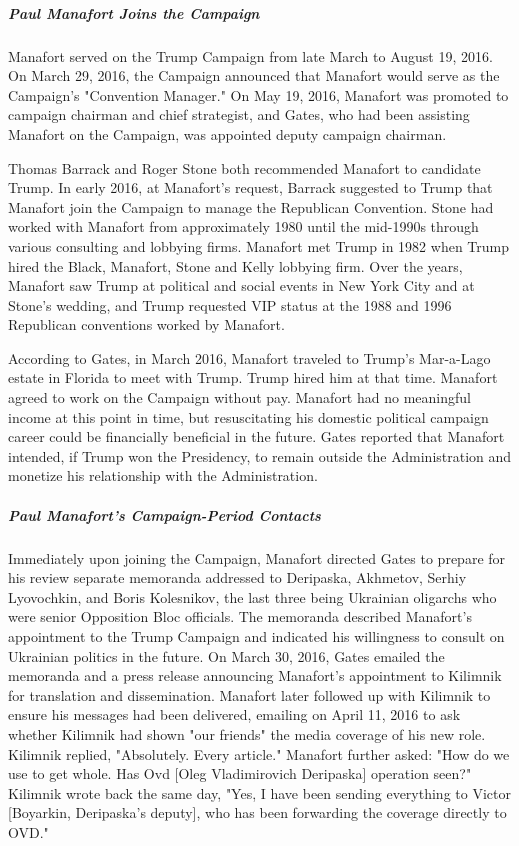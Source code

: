 \subparagraph{Paul Manafort Joins the Campaign}

Manafort served on the Trump Campaign from late March to August 19, 2016.
On March 29, 2016, the Campaign announced that Manafort would serve as the Campaign's "Convention Manager."%
On May 19, 2016, Manafort was promoted to campaign chairman and chief strategist, and Gates, who had been assisting Manafort on the Campaign, was appointed deputy campaign chairman.%

Thomas Barrack and Roger Stone both recommended Manafort to candidate Trump.%
In early 2016, at Manafort's request, Barrack suggested to Trump that Manafort join the Campaign to manage the Republican Convention.%
Stone had worked with Manafort from approximately 1980 until the mid-1990s through various consulting and lobbying firms.
Manafort met Trump in 1982 when Trump hired the Black, Manafort, Stone and Kelly lobbying firm.%
Over the years, Manafort saw Trump at political and social events in New York City and at Stone's wedding, and Trump requested VIP status at the 1988 and 1996 Republican conventions worked by Manafort.%

According to Gates, in March 2016, Manafort traveled to Trump's Mar-a-Lago estate in Florida to meet with Trump.
Trump hired him at that time.%
Manafort agreed to work on the Campaign without pay.
Manafort had no meaningful income at this point in time, but resuscitating his domestic political campaign career could be financially beneficial in the future.
Gates reported that Manafort intended, if Trump won the Presidency, to remain outside the Administration and monetize his relationship with the Administration.%

\subparagraph{Paul Manafort's Campaign-Period Contacts}

Immediately upon joining the Campaign, Manafort directed Gates to prepare for his review separate memoranda addressed to Deripaska, Akhmetov, Serhiy Lyovochkin, and Boris Kolesnikov,%
the last three being Ukrainian oligarchs who were senior Opposition Bloc officials.%
The memoranda described Manafort's appointment to the Trump Campaign and indicated his willingness to consult on Ukrainian politics in the future.
On March 30, 2016, Gates emailed the memoranda and a press release announcing Manafort's appointment to Kilimnik for translation and dissemination.%
Manafort later followed up with Kilimnik to ensure his messages had been delivered, emailing on April 11, 2016 to ask whether Kilimnik had shown "our friends" the media coverage of his new role.%
Kilimnik replied, "Absolutely.
Every article."
Manafort further asked: "How do we use to get whole.
Has Ovd [Oleg Vladimirovich Deripaska] operation seen?"
Kilimnik wrote back the same day, "Yes, I have been sending everything to Victor [Boyarkin, Deripaska's deputy], who has been forwarding the coverage directly to OVD."%

